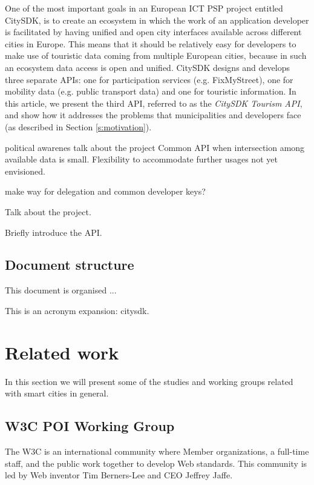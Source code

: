 \documentclass[times]{ettauth}
\begin{document}
One of the most important goals in an European ICT PSP project entitled CitySDK, is to create an ecosystem in which the work of an application developer is facilitated by having unified and open city interfaces available across different cities in Europe. This means that it should be relatively easy for developers to make use of touristic data coming from multiple European cities, because in such an ecosystem data access is open and unified. CitySDK designs and develops three separate APIs: one for participation services (e.g. FixMyStreet), one for mobility data (e.g. public transport data) and one for  touristic information. In this article, we present the third API, referred to as the \emph{CitySDK Tourism API}, and show how it addresses the problems that municipalities and developers face (as described in Section \ref{s:motivation}). 

political awarenes
talk about the project
Common API when intersection among available data is small.
Flexibility to accommodate further usages not yet envisioned.

make way for delegation and common developer keys?




Talk about the project.

Briefly introduce the API.

\subsection{Document structure}
\label{s:structure}
This document is organised ...

This is an acronym expansion: \ac{citysdk}.



\section{Related work}
In this section we will present some of the studies and working groups related with smart cities in general.  

\subsection{\acf{W3C} \acf{POI} Working Group}
\label{section:poi-wg}
The \ac{W3C} is an international community where Member organizations, a full-time staff, and the public work together to develop Web standards. This community is led by Web inventor Tim Berners-Lee and CEO Jeffrey Jaffe. 
\end{document}
